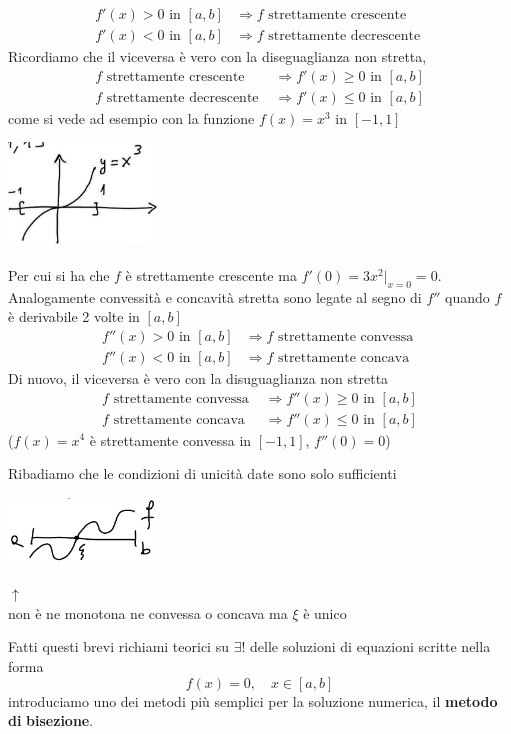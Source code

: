 \[\begin{split}
    f'(x)>0  \text{ in }  [a,b] & \Rightarrow f \text{ strettamente crescente } \\
    f'(x)<0  \text{ in }  [a,b] & \Rightarrow f \text{ strettamente decrescente }
\end{split}\]
Ricordiamo che il viceversa è vero con la diseguaglianza non stretta,
\[\begin{split}
    f \text{ strettamente crescente } & \Rightarrow f'(x)\ge 0 \text{ in } [a,b] \\
    f \text{ strettamente decrescente } & \Rightarrow f'(x)\le 0 \text{ in } [a,b] 
\end{split}\]
come si vede ad esempio con la funzione $f(x)=x^3$ in $[-1,1]$
\begin{center}
    \includegraphics[width=0.3\textwidth]{foto/5}\par
\end{center}
Per cui si ha che $f$ è strettamente crescente ma $f'(0)=3x^2|_{x=0}=0$.\\
Analogamente convessità e concavità stretta sono legate al segno di $f''$ quando $f$ è derivabile 2 volte in $[a,b]$
\[\begin{split}
    f''(x)>0  \text{ in }  [a,b] & \Rightarrow f \text{ strettamente convessa } \\
    f''(x)<0  \text{ in }  [a,b] & \Rightarrow f \text{ strettamente concava }
\end{split}\]
Di nuovo, il viceversa è vero con la disuguaglianza non stretta
\[\begin{split}
    f \text{ strettamente convessa } & \Rightarrow f''(x)\ge 0 \text{ in } [a,b] \\
    f \text{ strettamente concava } & \Rightarrow f''(x)\le 0 \text{ in } [a,b] 
\end{split}\]
($f(x) = x^4$ è  strettamente convessa in $[-1,1]$, $f''(0) = 0$)

Ribadiamo che le condizioni di unicità date sono solo sufficienti 
\begin{center}
    \includegraphics[width=0.3\textwidth]{foto/pagina8_1}\par
$\uparrow$ \\
non è ne monotona ne convessa o concava ma $\xi$ è unico\\
\end{center}
Fatti questi brevi richiami teorici su $\exists!$ delle soluzioni di equazioni scritte nella forma 
\[f(x)=0, \quad x \in [a,b]\]
introduciamo uno dei metodi più semplici per la soluzione numerica, il \textbf{metodo} \textbf{di} \textbf{bisezione}.

